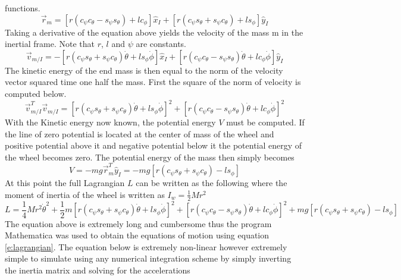 \documentclass[]{aiaa-tc} %
\begin{document}
functions. 
\begin{equation}
  \vec{r}_m = [r (c_{\psi}c_{\theta} - s_{\psi}s_{\theta}) + lc_{\phi}]\hat{x}_I + 
  [r (c_{\psi}s_{\theta} + s_{\psi}c_{\theta})+ls_{\phi}]\hat{y}_I
\end{equation}
Taking a derivative of the equation above yields the velocity of the
mass m in the inertial frame. Note that $r$, $l$ and $\psi$ are
constants.
\begin{equation}
  \vec{v}_{m/I} = -[r(c_{\psi}s_{\theta}+s_{\psi}c_{\theta})\dot{\theta}+ls_{\phi}\dot{\phi}]\hat{x}_I
  + [r(c_{\psi}c_{\theta}-s_{\psi}s_{\theta})\dot{\theta}+lc_{\phi}\dot{\phi}]\hat{y}_I
\end{equation}
The kinetic energy of the end mass is then equal to the norm of the
velocity vector squared time one half the mass. First the square of
the norm of velocity is computed below.
\begin{equation}
  \vec{v}_{m/I}^T\vec{v}_{m/I} =
      [r(c_{\psi}s_{\theta}+s_{\psi}c_{\theta})\dot{\theta}+ls_{\phi}\dot{\phi}]^2
      + [r(c_{\psi}c_{\theta}-s_{\psi}s_{\theta})\dot{\theta}+lc_{\phi}\dot{\phi}]^2
\end{equation}
With the Kinetic energy now known, the potential energy $V$ must be
computed. If the line of zero potential is located at the center of
mass of the wheel and positive potential above it and negative
potential below it the potential energy of the wheel becomes zero. The
potential energy of the mass then simply becomes
\begin{equation}
  V=-mg\vec{r}_m^T\hat{y}_I = -mg[r (c_{\psi}s_{\theta} +
  s_{\psi}c_{\theta})-ls_{\phi}]
\end{equation}
At this point the full Lagrangian $L$ can be written as the following
where the moment of inertia of the wheel is written as $I_w=\frac{1}{2}Mr^2$
\begin{equation}
  L = \frac{1}{4}Mr^2\dot{\theta}^2 + \frac{1}{2}m[r(c_{\psi}s_{\theta}+s_{\psi}c_{\theta})\dot{\theta}+ls_{\phi}\dot{\phi}]^2
      +
      [r(c_{\psi}c_{\theta}-s_{\psi}s_{\theta})\dot{\theta}+lc_{\phi}\dot{\phi}]^2
      + mg[r (c_{\psi}s_{\theta} +
        s_{\psi}c_{\theta})-ls_{\phi}]
\end{equation}
The equation above is extremely long and cumbersome thus the program
Mathematica was used to obtain the equations of motion using equation
\ref{e:lagrangian}. The equation below is extremely non-linear however
extremely simple to simulate using any numerical integration scheme by
simply inverting the inertia matrix and solving for the accelerations
\end{document}
